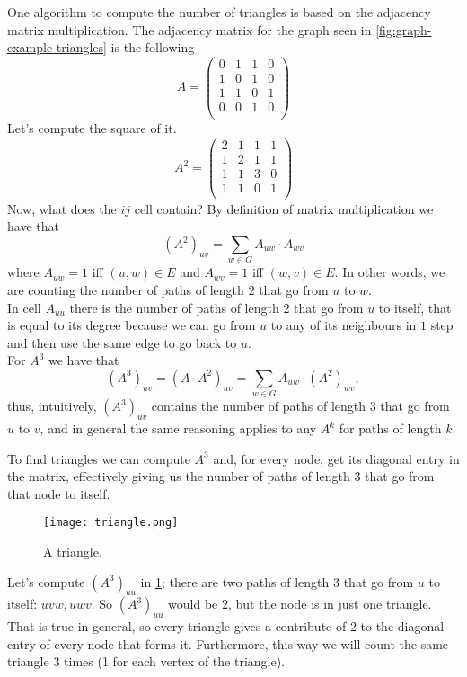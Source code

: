 One algorithm to compute the number of triangles is based on the adjacency matrix multiplication.
The adjacency matrix for the graph seen in \cref{fig:graph-example-triangles} is the following
\[
	A = \begin{pmatrix}
		0 & 1 & 1 & 0 \\
		1 & 0 & 1 & 0 \\
		1 & 1 & 0 & 1 \\
		0 & 0 & 1 & 0 \\
	\end{pmatrix}
\]
Let's compute the square of it.
\[
	A^2 = 	\begin{pmatrix}
		2 & 1 & 1 & 1 \\
		1 & 2 & 1 & 1 \\
		1 & 1 & 3 & 0 \\
		1 & 1 & 0 & 1 \\
	\end{pmatrix}
\]
Now, what does the $ij$ cell contain? By definition of matrix multiplication we have that
\[
	(A^2)_{uv} = \sum_{w \in G}A_{uw} \cdot A_{wv}
\]
where $A_{uw} = 1$ iff $(u,w) \in E$ and $A_{wv} = 1$ iff $(w,v) \in E$. In other words, we are counting the number of paths of length $2$ that go from $u$ to $w$.\\
In cell $A_{uu}$ there is the number of paths of length $2$ that go from $u$ to itself, that is equal to its degree because we can go from $u$ to any of its neighbours in $1$ step and then use the same edge to go back to $u$.\\
For $A^3$ we have that
\[
    (A^3)_{uv} = \left( A \cdot A^2 \right)_{uv} = \sum_{w \in G} A_{uw} \cdot (A^2)_{wv},
\]
thus, intuitively, $(A^3)_{uv}$ contains the number of paths of length $3$ that go from $u$ to $v$, and in general the same reasoning applies to any $A^k$ for paths of length $k$.

To find triangles we can compute $A^3$ and, for every node, get its diagonal entry in the matrix, effectively giving us the number of paths of length $3$ that go from that node to itself.

\begin{figure}
	\centering
	\texttt{[image: triangle.png]}
	\caption{A triangle.}\label{fig:triangle-graph}
\end{figure}

Let's compute $(A^3)_{uu}$ in \cref{fig:triangle-graph}; there are two paths of length $3$ that go from $u$ to itself: $uvw, uwv$. So $(A^3)_{uu}$ would be $2$, but the node is in just one triangle.
That is true in general, so every triangle gives a contribute of $2$ to the diagonal entry of every node that forms it. Furthermore, this way we will count the same triangle $3$ times (1 for each vertex of the triangle).

